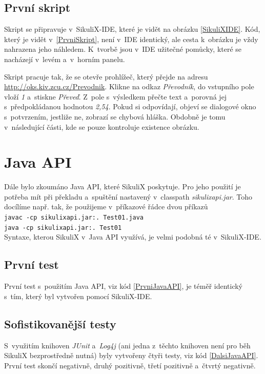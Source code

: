 		\subsection{První skript}
		Skript se připravuje v~SikuliX-IDE, které je vidět na obrázku \ref{SikuliXIDE}. Kód, který je vidět v~\ref{PrvniSkript}, není v~IDE identický, ale cesta k~obrázku je vždy nahrazena jeho náhledem. K~tvorbě jsou v~IDE užitečné pomůcky, které se nacházejí v~levém a~v~horním panelu.
		
		Skript pracuje tak, že se otevře prohlížeč, který přejde na adresu \url{http://oks.kiv.zcu.cz/Prevodnik}. Klikne na odkaz \emph{Převodník}, do vstupního pole vloží \emph{1} a~stiskne \emph{Převeď}. Z~pole s~výsledkem přečte text a~porovná jej s~předpokládanou hodnotou \emph{2,54}. Pokud si odpovídají, objeví se dialogové okno s~potvrzením, jestliže ne, zobrazí se chybová hláška. Obdobně je tomu v~následující části, kde se pouze kontroluje existence obrázku.
		
	\section{Java API}
	Dále bylo zkoumáno Java API, které SikuliX poskytuje. Pro jeho použití je potřeba mít při překladu a~spuštění nastavený v~classpath \emph{sikulixapi.jar}. Toho docílíme např. tak, že použijeme v~příkazové řádce dvou příkazů\\\texttt{javac -cp sikulixapi.jar:. Test01.java}\\\texttt{java -cp sikulixapi.jar:. Test01}\\ Syntaxe, kterou SikuliX v~Java API využívá, je velmi podobná té v~SikuliX-IDE.
	
		\subsection{První test}
		První test s~použitím Java API, viz kód \ref{PrvniJavaAPI}, je téměř identický s~tím, který byl vytvořen pomocí SikuliX-IDE.
	
		\subsection{Sofistikovanější testy}
		S~využitím knihoven \emph{JUnit} a~\emph{Log4j} (ani jedna z~těchto knihoven není pro běh SikuliX bezprostředně nutná) byly vytvořeny čtyři testy, viz kód \ref{DalsiJavaAPI}. První test skončí negativně, druhý pozitivně, třetí pozitivně a~čtvrtý negativně.